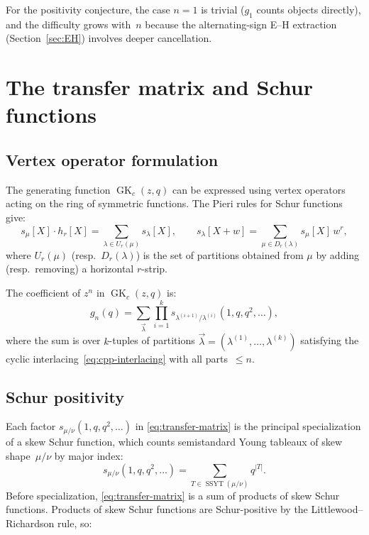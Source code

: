 \documentclass[11pt]{article}
\newcommand{\SSYT}{\operatorname{SSYT}}
\newcommand{\GK}{\operatorname{GK}}
\begin{document}
For the positivity conjecture, the case $n = 1$ is trivial
($g_1$ counts objects directly), and the difficulty grows
with~$n$ because the alternating-sign E--H extraction
(Section~\ref{sec:EH}) involves deeper cancellation.

\section{The transfer matrix and Schur functions}
\label{sec:transfer-matrix}

\subsection{Vertex operator formulation}

The generating function $\GK_c(z,q)$ can be expressed using
vertex operators acting on the ring of symmetric functions.
The Pieri rules for Schur functions give:
\[
  s_\mu[X] \cdot h_r[X]
  = \sum_{\lambda \in U_r(\mu)} s_\lambda[X],
  \qquad
  s_\lambda[X + w]
  = \sum_{\mu \in D_r(\lambda)} s_\mu[X]\, w^r,
\]
where $U_r(\mu)$ (resp.\ $D_r(\lambda)$) is the set of
partitions obtained from $\mu$ by adding (resp.\ removing) a
horizontal $r$-strip.

The coefficient of $z^n$ in $\GK_c(z,q)$ is:
\begin{equation}\label{eq:transfer-matrix}
  g_n(q) = \sum_{\vec{\lambda}}
  \prod_{i=1}^{k}
  s_{\lambda^{(i+1)}/\lambda^{(i)}}(1, q, q^2, \ldots),
\end{equation}
where the sum is over $k$-tuples of partitions
$\vec{\lambda} = (\lambda^{(1)}, \ldots, \lambda^{(k)})$
satisfying the cyclic interlacing~\eqref{eq:cpp-interlacing}
with all parts~$\leq n$.

\subsection{Schur positivity}

Each factor $s_{\mu/\nu}(1, q, q^2, \ldots)$ in
\eqref{eq:transfer-matrix} is the principal specialization
of a skew Schur function, which counts semistandard Young
tableaux of skew shape~$\mu/\nu$ by major index:
\[
  s_{\mu/\nu}(1, q, q^2, \ldots)
  = \sum_{T \in \SSYT(\mu/\nu)} q^{|T|}.
\]
Before specialization, \eqref{eq:transfer-matrix} is a sum
of products of skew Schur functions. Products of skew Schur
functions are Schur-positive by the Littlewood--Richardson
rule, so:
\end{document}
